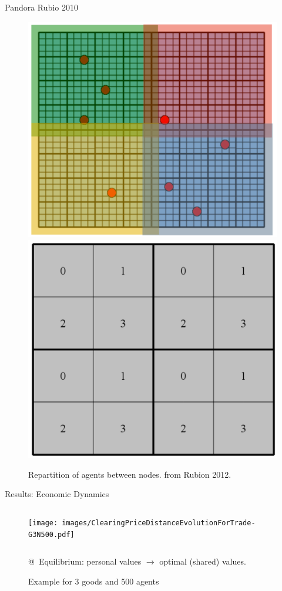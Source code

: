 \documentclass[10pt, notes=show]{beamer}
\begin{document}
\begin{frame}{Pandora}
    Rubio 2010
    \begin{figure}[h]
        \centering
        \includegraphics[width=.3\textwidth]{images/splitPandora.png}
        \includegraphics[width=.3\textwidth]{images/numbersCPU.png}
        \caption{Repartition of agents between nodes. from Rubion 2012.}
        \label{fig:splp}
    \end{figure}
    
\end{frame}

\begin{frame}{Results: Economic Dynamics}
	\begin{figure}
	    \caption{Example for 3 goods and 500 agents}
	    \begin{columns}
		\texttt{[image: images/ClearingPriceDistanceEvolutionForTrade-G3N500.pdf]}\\
	    \end{columns}
		@~Equilibrium: personal values  $\rightarrow$ optimal (shared) values.
	\end{figure}
\end{frame}
\end{document}
